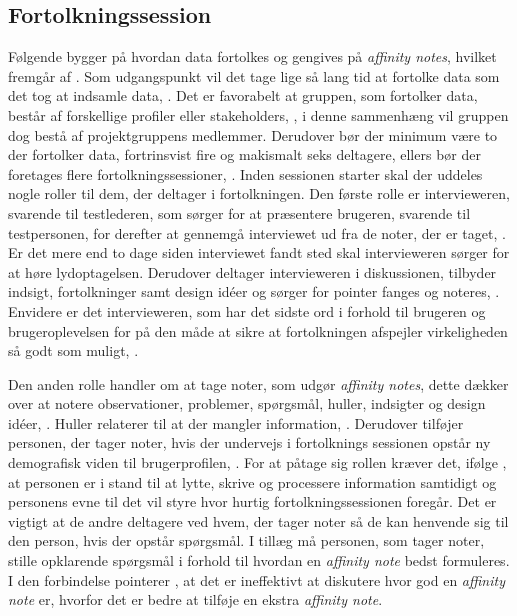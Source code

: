 \subsection{Fortolkningssession}
\label{ParametreFortolkningssession}
%
Følgende bygger på hvordan data fortolkes og gengives på \textit{affinity notes}, hvilket fremgår af \textcite[ss. 101-122]{Book:CIInterpretationSession}. Som udgangspunkt vil det tage lige så lang tid at fortolke data som det tog at indsamle data, \parencite[s. 102]{Book:CIInterpretationSession}. Det er favorabelt at gruppen, som fortolker data, består af forskellige profiler eller stakeholders, \parencite[s. 104]{Book:CIInterpretationSession}, i denne sammenhæng vil gruppen dog bestå af projektgruppens medlemmer. Derudover bør der minimum være to der fortolker data, fortrinsvist fire og makismalt seks deltagere, ellers bør der foretages flere fortolkningssessioner, \parencite[s. 104]{Book:CIInterpretationSession}. \blankline
%
Inden sessionen starter skal der uddeles nogle roller til dem, der deltager i fortolkningen. Den første rolle er intervieweren, svarende til testlederen, som sørger for at præsentere brugeren, svarende til testpersonen, for derefter at gennemgå interviewet ud fra de noter, der er taget, \parencite[ss. 106-107]{Book:CIInterpretationSession}. Er det mere end to dage siden interviewet fandt sted skal intervieweren sørger for at høre lydoptagelsen. Derudover deltager intervieweren i diskussionen, tilbyder indsigt, fortolkninger samt design idéer og sørger for pointer fanges og noteres, \parencite[s. 107]{Book:CIInterpretationSession}. Envidere er det intervieweren, som har det sidste ord i forhold til brugeren og brugeroplevelsen for på den måde at sikre at fortolkningen afspejler virkeligheden så godt som muligt, \parencite[s. 107]{Book:CIInterpretationSession}.

Den anden rolle handler om at tage noter, som udgør \textit{affinity notes}, dette dækker over at notere observationer, problemer, spørgsmål, huller, indsigter og design idéer, \parencite[s. 107]{Book:CIInterpretationSession}. Huller relaterer til at der mangler information, \parencite[s. 162]{Book:BuildingAnAffinity}. Derudover tilføjer personen, der tager noter, hvis der undervejs i fortolknings sessionen opstår ny demografisk viden til brugerprofilen, \parencite[s. 107]{Book:CIInterpretationSession}. For at påtage sig rollen kræver det, ifølge \textcite[s. 107]{Book:CIInterpretationSession}, at personen er i stand til at lytte, skrive og processere information samtidigt og personens evne til det vil styre hvor hurtig fortolkningssessionen foregår. Det er vigtigt at de andre deltagere ved hvem, der tager noter så de kan henvende sig til den person, hvis der opstår spørgsmål. I tillæg må personen, som tager noter, stille opklarende spørgsmål i forhold til hvordan en \textit{affinity note} bedst formuleres. I den forbindelse pointerer \textcite[s. 108]{Book:CIInterpretationSession}, at det er ineffektivt at diskutere hvor god en \textit{affinity note} er, hvorfor det er bedre at tilføje en ekstra \textit{affinity note}. 

